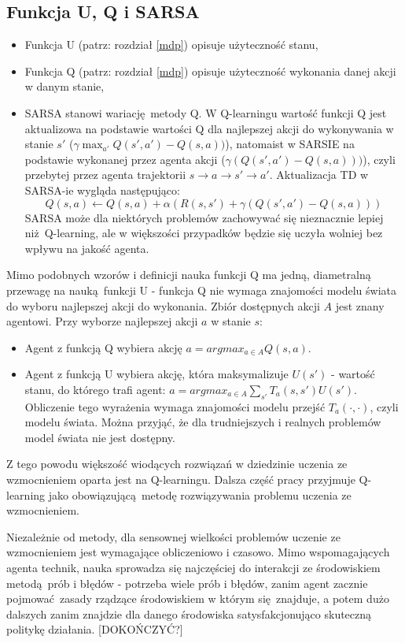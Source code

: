 \subsection{Funkcja U, Q i SARSA}\label{qlearning}
\begin{itemize}
\item Funkcja U (patrz: rozdział \ref{mdp}) opisuje użyteczność stanu,
\item Funkcja Q (patrz: rozdział \ref{mdp}) opisuje użyteczność wykonania danej akcji w danym stanie,
\item SARSA stanowi wariację metody Q. W Q-learningu wartość funkcji Q jest aktualizowa na podstawie wartości Q dla najlepszej akcji do wykonywania w stanie $s'$ ($\gamma \max_{a'}Q(s',a') - Q (s,a))$), natomaist w SARSIE na podstawie wykonanej przez agenta akcji ($\gamma (Q(s',a') - Q (s,a)))$), czyli przebytej przez agenta trajektorii $ s \rightarrow a \rightarrow s' \rightarrow a'$. Aktualizacja TD w SARSA-ie wygląda następująco:
$$Q(s,a) \leftarrow Q(s,a) + \alpha (R(s,s') + \gamma (Q(s',a') - Q (s,a)))$$
SARSA może dla niektórych problemów zachowywać się nieznacznie lepiej niż Q-learning, ale w większości przypadków będzie się uczyła wolniej bez wpływu na jakość agenta.
\end{itemize}

Mimo podobnych wzorów i definicji nauka funkcji Q ma jedną, diametralną przewagę na nauką funkcji U - funkcja Q nie wymaga znajomości modelu świata do wyboru najlepszej akcji do wykonania. Zbiór dostępnych akcji $A$ jest znany agentowi. Przy wyborze najlepszej akcji $a$ w stanie $s$:
\begin{itemize}
\item Agent z funkcją Q wybiera akcję $a = argmax_{a \in A} Q(s,a)$.

\item Agent z funkcją U wybiera akcję, która maksymalizuje $U(s')$ - wartość stanu, do którego trafi agent: $a = argmax_{a \in A} \sum_{s'} T_a(s,s')U(s')$. Obliczenie tego wyrażenia wymaga znajomości modelu przejść $T_a(\cdot, \cdot)$, czyli modelu świata. Można przyjąć, że dla trudniejszych i realnych problemów model świata nie jest dostępny.
\end{itemize}

Z tego powodu większość wiodących rozwiązań w dziedzinie uczenia ze wzmocnieniem oparta jest na Q-learningu.  Dalsza część pracy przyjmuje Q-learning jako obowiązującą metodę rozwiązywania problemu uczenia ze wzmocnieniem.

Niezależnie od metody, dla sensownej wielkości problemów uczenie ze wzmocnieniem jest wymagające obliczeniowo i czasowo. Mimo wspomagających agenta technik, nauka sprowadza się najczęściej do interakcji ze środowiskiem metodą prób i błędów - potrzeba wiele prób i błędów, zanim agent zacznie pojmować zasady rządzące środowiskiem w którym się znajduje, a potem dużo dalszych zanim znajdzie dla danego środowiska satysfakcjonująco skuteczną politykę działania.
[DOKOŃCZYĆ?]

